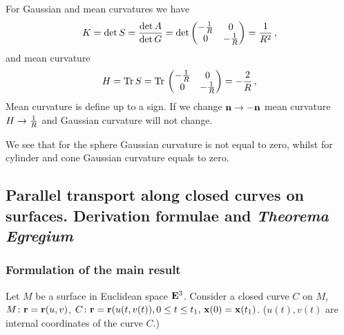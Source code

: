 \documentclass[12pt]{article}
\theoremstyle{theorem}
\numberwithin{equation}{section}
\begin{document}
{$$                    $$
For Gaussian and mean curvatures we have
     \begin{equation}\label{Gaussianforcylinder}
        K=\det S={\det A\over \det G}=\det
                              \begin{pmatrix}-{1\over R}&0\cr
                                0&-{1\over R}\cr
                                   \end{pmatrix}={1\over R^2}\,,
     \end{equation}
     and mean curvature
      \begin{equation}\label{meanianforcylinder}
        H={\rm Tr\,} S={\rm Tr\,}
                              \begin{pmatrix}-{1\over R}&0\cr
                                0&-{1\over R}\cr
                                   \end{pmatrix}=-{2\over R}\,,
     \end{equation}
Mean curvature is define up to a sign. If we change ${\bf n}\to-{\bf n}$ mean curvature $H\to {1\over R}$ and Gaussian curvature
will not change.


We see that for the sphere  Gaussian curvature is not equal to zero, whilst for cylinder and cone Gaussian curvature
equals to zero.


\subsection {Parallel transport along closed curves on surfaces. Derivation formulae and {\it Theorema Egregium} }

\subsubsection {Formulation of the main result}

Let $M$ be a surface in  Euclidean space ${\bf E}^3$.
  Consider a closed curve $C$ on $M$,
  $M\colon {\bf r}={\bf r}(u,v)$, $C\colon {\bf r}={\bf r}(u(t,v(t)), 0\leq t\leq t_1, \, {\bf x}(0)={\bf x}(t_1)$.
  ($u(t), v(t)$ are internal coordinates of the curve $C$.)

}
\end{document}
